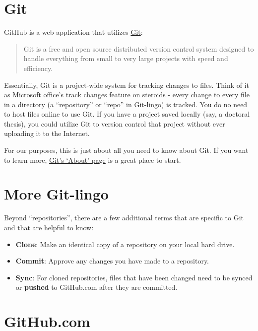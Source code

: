 \documentclass[]{book}
\providecommand{\tightlist}{%
  \setlength{\itemsep}{0pt}\setlength{\parskip}{0pt}}
\begin{document}
\section{Git}\label{git}

GitHub is a web application that utilizes
\href{https://git-scm.com}{Git}:

\begin{quote}
Git is a free and open source distributed version control system
designed to handle everything from small to very large projects with
speed and efficiency.
\end{quote}

Essentially, Git is a project-wide system for tracking changes to files.
Think of it as Microsoft office's track changes feature on steroids -
every change to every file in a directory (a ``repository'' or ``repo''
in Git-lingo) is tracked. You do no need to host files online to use
Git. If you have a project saved locally (say, a doctoral thesis), you
could utilize Git to version control that project without ever uploading
it to the Internet.

For our purposes, this is just about all you need to know about Git. If
you want to learn more, \href{https://git-scm.com/about}{Git's `About'
page} is a great place to start.

\section{More Git-lingo}\label{more-git-lingo}

Beyond ``repositories'', there are a few additional terms that are
specific to Git and that are helpful to know:

\begin{itemize}
\tightlist
\item
  \textbf{Clone}: Make an identical copy of a repository on your local
  hard drive.
\item
  \textbf{Commit}: Approve any changes you have made to a repository.
\item
  \textbf{Sync}: For cloned repositories, files that have been changed
  need to be synced or \textbf{pushed} to GitHub.com after they are
  committed.
\end{itemize}

\section{GitHub.com}\label{github.com}
\end{document}
